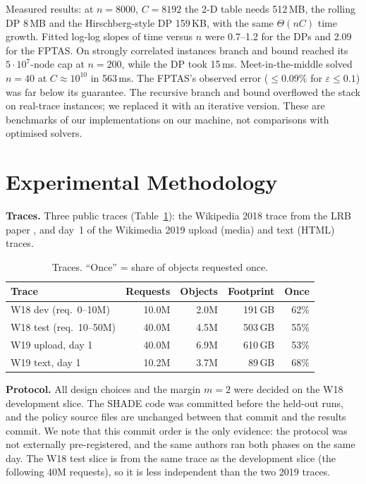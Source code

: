 \documentclass[conference]{IEEEtran}
\begin{document}
Measured results: at $n=8000$, $C=8192$ the 2-D table needs 512\,MB, the rolling DP 8\,MB and the Hirschberg-style DP
159\,KB, with the same $\Theta(nC)$ time growth. Fitted log-log slopes of time versus $n$ were 0.7--1.2 for the DPs and
2.09 for the FPTAS. On strongly correlated instances branch and bound reached its $5\cdot10^7$-node cap at $n=200$,
while the DP took 15\,ms. Meet-in-the-middle solved $n=40$ at $C\approx10^{10}$ in 563\,ms. The FPTAS's observed error
($\le$0.09\% for $\varepsilon\le0.1$) was far below its guarantee. The recursive branch and bound overflowed the
stack on real-trace instances; we replaced it with an iterative version. These are benchmarks of our implementations
on our machine, not comparisons with optimised solvers.

\section{Experimental Methodology}
\textbf{Traces.} Three public traces (Table~\ref{tab:traces}): the Wikipedia 2018 trace from the LRB paper
\cite{lrb}, and day~1 of the Wikimedia 2019 upload (media) and text (HTML) traces.
\begin{table}[t]
\centering
\caption{Traces. ``Once'' = share of objects requested once.}\label{tab:traces}
\begin{tabular}{@{}lrrrr@{}}
\toprule
Trace & Requests & Objects & Footprint & Once \\
\midrule
W18 dev (req.\ 0--10M) & 10.0M & 2.0M & 191\,GB & 62\% \\
W18 test (req.\ 10--50M) & 40.0M & 4.5M & 503\,GB & 55\% \\
W19 upload, day 1 & 40.0M & 6.9M & 610\,GB & 53\% \\
W19 text, day 1 & 10.2M & 3.7M & 89\,GB & 68\% \\
\bottomrule
\end{tabular}
\end{table}

\textbf{Protocol.} All design choices and the margin $m=2$ were decided on the W18 development slice. The SHADE code
was committed before the held-out runs, and the policy source files are unchanged between that commit and the
results commit. We note that this commit order is the only evidence: the protocol was not externally
pre-registered, and the same authors ran both phases on the same day.
The W18 test slice is from the same trace as the development slice (the following 40M requests), so it is less
independent than the two 2019 traces.
\end{document}
